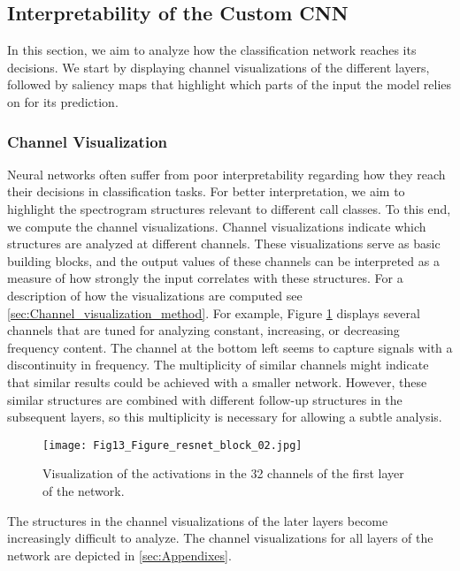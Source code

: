 \documentclass[preprint,NumberedRefs]{JASA}
\begin{document}
\subsection{Interpretability of the Custom CNN}
\label{sec:Interpretability_of_the_custum_CNN}

In this section, we aim to analyze how the classification network reaches its decisions. We start by displaying channel visualizations of the different layers, followed by saliency maps that highlight which parts of the input the model relies on for its prediction.

\subsubsection{Channel Visualization}

Neural networks often suffer from poor interpretability regarding how they reach their decisions in classification tasks. For better interpretation, we aim to highlight the spectrogram structures relevant to different call classes. To this end, we compute the channel visualizations. Channel visualizations indicate which structures are analyzed at different channels. These visualizations serve as basic building blocks, and the output values of these channels can be interpreted as a measure of how strongly the input correlates with these structures. For a description of how the visualizations are computed see \autoref{sec:Channel_visualization_method}. For example, Figure \ref{fig:channel_resnet2} displays several channels that are tuned for analyzing constant, increasing, or decreasing frequency content. The channel at the bottom left seems to capture signals with a discontinuity in frequency. The multiplicity of similar channels might indicate that similar results could be achieved with a smaller network. However, these similar structures are combined with different follow-up structures in the subsequent layers, so this multiplicity is necessary for allowing a subtle analysis.

\begin{figure}[ht]
    \texttt{[image: Fig13\_Figure\_resnet\_block\_02.jpg]}
    \caption{\label{fig:channel_resnet2}{Visualization of the activations in the 32 channels of the first layer of the network.}}
\end{figure}

The structures in the channel visualizations of the later layers become increasingly difficult to analyze. The channel visualizations for all layers of the network are depicted in \autoref{sec:Appendixes}.
\end{document}
